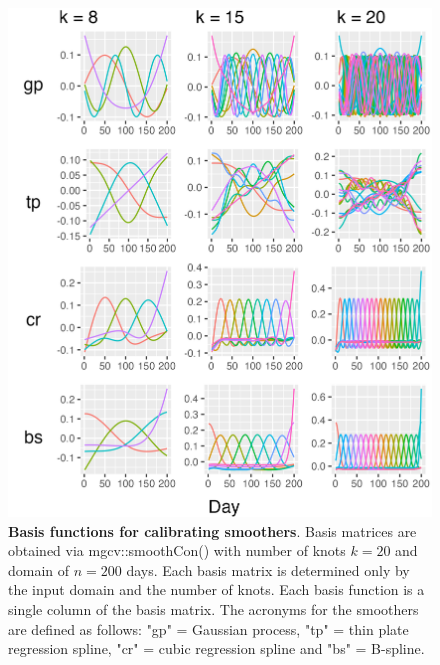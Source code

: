 \documentclass[
11pt, %
oneside, %
english, %
singlespacing, %
]{macthesis} %
\begin{document}
\begin{figure}[H]
\centering
\includegraphics[width=\textwidth]{figure/Simulated/unaggregated/simulation_gp_20_k(5,10,20)_bsd1_beta1_plot_basis.png}
\caption[Basis Functions for Smoothing Basis.]{\textbf{Basis functions for calibrating smoothers}. Basis matrices are obtained via mgcv::smoothCon() with number of knots \(k=20\) and domain of \(n=200\) days. Each basis matrix is determined only by the input domain and the number of knots. Each basis function is a single column of the basis matrix. The acronyms for the smoothers are defined as follows: "gp" = Gaussian process, "tp" = thin plate regression spline, "cr" = cubic regression spline and "bs" = B-spline.}
\label{fig:sim_basis}
\end{figure}
\end{document}
